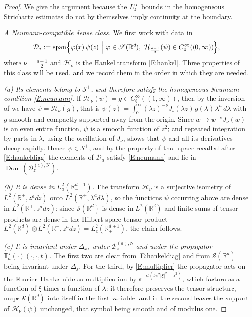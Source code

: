 \documentclass[11pt,letter]{amsart}
\def \RN {\mathbb{R}_+^{d+1}}
\def \R {\mathbb{R}}
\newcommand{\BaN}{\mathscr B_z^{(a),\mathrm N}}
\newcommand{\Rd}{\mathbb R^d}
\numberwithin{equation}{section}
\newcommand{\Dom}{\operatorname{Dom}}
\numberwithin{equation}{section}
\begin{document}
\begin{proof}
We give the argument because the $L^\infty_z$ bounds in the homogeneous
Strichartz estimates do not by themselves imply continuity at the boundary.

\smallskip
\noindent\emph{A Neumann-compatible dense class.} We first work with data in
\[
\mathcal D_a:=\operatorname{span}
\Bigl\{\varphi(x)\,\psi(z)\ \Big|\
\varphi\in\mathscr S(\Rd),\
\mathcal H_{\frac{a-1}2}(\psi)\in C_0^\infty((0,\infty))\Bigr\},
\]
where $\nu=\frac{a-1}2$ and $\mathcal H_\nu$ is the Hankel transform
\eqref{E:hankel}. Three properties of this class will be used, and we record
them in the order in which they are needed.

\emph{(a) Its elements belong to $\mathscr S^+$, and therefore satisfy the
homogeneous Neumann condition \eqref{E:neumann}.} If $\mathcal H_\nu(\psi)=g\in
C_0^\infty((0,\infty))$, then by the inversion of \cite[Theorem~2.1]{GS1} we
have $\psi=\mathcal H_\nu(g)$, that is
$\psi(z)=\int_0^\infty(\lambda z)^{-\nu}J_\nu(\lambda z)\,g(\lambda)\,\lambda^a\,d\lambda$
with $g$ smooth and compactly supported away from the origin. Since
$w\mapsto w^{-\nu}J_\nu(w)$ is an even entire function, $\psi$ is a smooth
function of $z^2$; and repeated integration by parts in $\lambda$, using the
oscillation of $J_\nu$, shows that $\psi$ and all its derivatives decay
rapidly. Hence $\psi\in\mathscr S^+$, and by the property of that space recalled
after \eqref{E:hankeldiag} the elements of $\mathcal D_a$ satisfy
\eqref{E:neumann} and lie in $\Dom(\BaN)$.

\emph{(b) It is dense in $L^2_a(\RN)$.} The transform $\mathcal H_\nu$ is a
surjective isometry of $L^2(\R^+,z^adz)$ onto $L^2(\R^+,\lambda^ad\lambda)$, so
the functions $\psi$ occurring above are dense in $L^2(\R^+,z^adz)$; since
$\mathscr S(\Rd)$ is dense in $L^2(\Rd)$ and finite sums of tensor products are
dense in the Hilbert space tensor product
$L^2(\Rd)\otimes L^2(\R^+,z^adz)=L^2_a(\RN)$, the claim follows.

\emph{(c) It is invariant under $\Delta_x$, under $\BaN$ and under the
propagator $\mathbb T^\star_a(\cdot)(\cdot,\cdot,t)$.} The first two are clear
from \eqref{E:hankeldiag} and from $\mathscr S(\Rd)$ being invariant under
$\Delta_x$. For the third, by \eqref{E:multiplier} the propagator acts on the
Fourier--Hankel side as multiplication by
$e^{-it(4\pi^2|\xi|^2+\lambda^2)}$, which factors as a function of $\xi$ times a
function of $\lambda$: it therefore preserves the tensor structure, maps
$\mathscr S(\Rd)$ into itself in the first variable, and in the second leaves
the support of $\mathcal H_\nu(\psi)$ unchanged, that symbol being smooth and
of modulus one.


\end{proof}
\end{document}
